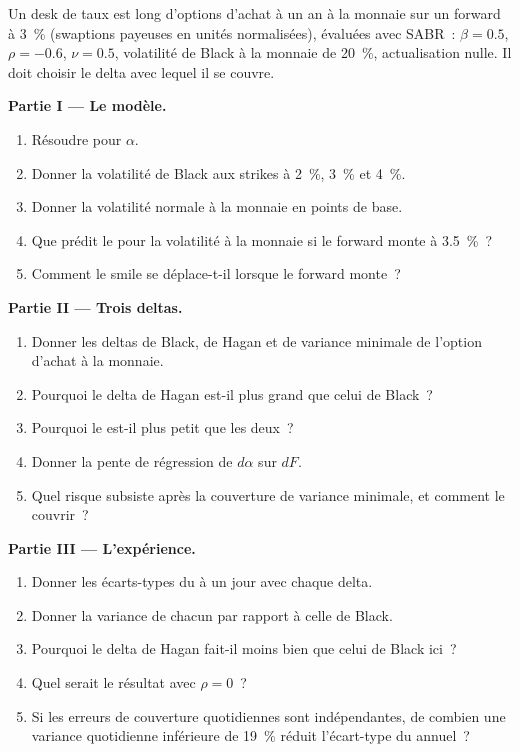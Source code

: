 \begin{problem}\label{pb:dv:sabr-and-smile-dynamics:1}
Un desk de taux est long d'options d'achat à un an à la monnaie sur un forward à 3~\% (swaptions payeuses en unités normalisées), évaluées
avec SABR~: $\beta=0.5$, $\rho=-0.6$, $\nu=0.5$, volatilité de Black à la monnaie de 20~\%, actualisation nulle. Il doit choisir le
delta avec lequel il se couvre.

\medskip\noindent\textbf{Partie I --- Le modèle.}
\begin{enumerate}
\item Résoudre pour $\alpha$.
\item Donner la volatilité de Black aux strikes à 2~\%, 3~\% et 4~\%.
\item Donner la volatilité normale à la monnaie en points de base.
\item Que prédit le  pour la volatilité à la monnaie si le forward monte à 3.5~\%~?
\item Comment le smile se déplace-t-il lorsque le forward monte~?
\end{enumerate}

\medskip\noindent\textbf{Partie II --- Trois deltas.}
\begin{enumerate}[resume]
\item Donner les deltas de Black, de Hagan et de variance minimale de l'option d'achat à la monnaie.
\item Pourquoi le delta de Hagan est-il plus grand que celui de Black~?
\item Pourquoi le  est-il plus petit que les deux~?
\item Donner la pente de régression de $d\alpha$ sur $dF$.
\item Quel risque subsiste après la couverture de variance minimale, et comment le couvrir~?
\end{enumerate}

\medskip\noindent\textbf{Partie III --- L'expérience.}
\begin{enumerate}[resume]
\item Donner les écarts-types du  à un jour avec chaque delta.
\item Donner la variance de chacun par rapport à celle de Black.
\item Pourquoi le delta de Hagan fait-il moins bien que celui de Black ici~?
\item Quel serait le résultat avec $\rho=0$~?
\item Si les erreurs de couverture quotidiennes sont indépendantes, de combien une variance quotidienne inférieure de 19~\% réduit
l'écart-type du  annuel~?
\end{enumerate}


\end{problem}
